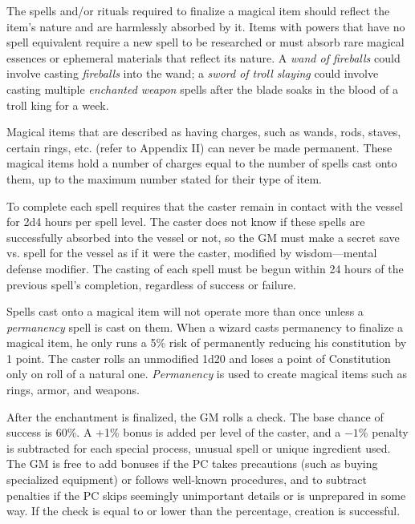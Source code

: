 \begin{multicols}{2}
The spells and/or rituals required to finalize a magical item should reflect the item's nature and are harmlessly absorbed by it.  Items with powers that have no spell equivalent require a new spell to be researched or must absorb rare magical essences or ephemeral materials that reflect its nature.  A \textit{wand of fireballs} could involve casting \textit{fireballs} into the wand; a \textit{sword of troll slaying} could involve casting multiple \textit{enchanted weapon} spells after the blade soaks in the blood of a troll king for a week.  

Magical items that are described as having charges, such as wands, rods, staves, certain rings, etc. (refer to Appendix II) can never be made permanent.  These magical items hold a number of charges equal to the number of spells cast onto them, up to the maximum number stated for their type of item.

To complete each spell requires that the caster remain in contact with the vessel for 2d4 hours per spell level.  The caster does not know if these spells are successfully absorbed into the vessel or not, so the GM must make a secret save vs. spell for the vessel as if it were the caster, modified by wisdom---mental defense modifier.  The casting of each spell must be begun within 24 hours of the previous spell's completion, regardless of success or failure.  

Spells cast onto a magical item will not operate more than once unless a \textit{permanency} spell is cast on them.  When a wizard casts permanency to finalize a magical item, he only runs a 5\% risk of permanently reducing his constitution by 1 point.  The caster rolls an unmodified 1d20 and loses a point of Constitution only on roll of a natural one.  \textit{Permanency} is used to create magical items such as rings, armor, and weapons.  

After the enchantment is finalized, the GM rolls a check.  The base chance of success is 60\%.  A +1\% bonus is added per level of the caster, and a $-1$\% penalty is subtracted for each special process, unusual spell or unique ingredient used.  The GM is free to add bonuses if the PC takes precautions (such as buying specialized equipment) or follows well-known procedures, and to subtract penalties if the PC skips seemingly unimportant details or is unprepared in some way.  If the check is equal to or lower than the percentage, creation is successful. 


\end{multicols}
